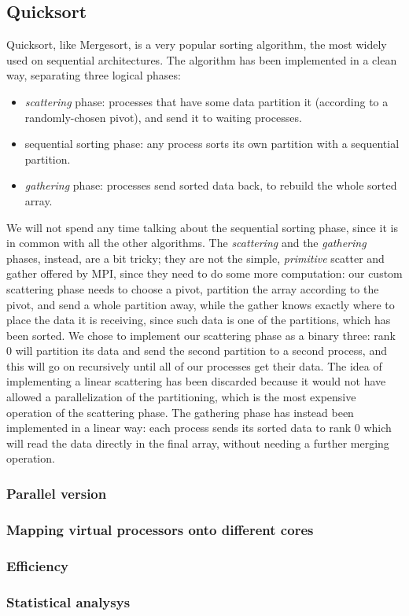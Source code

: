 \subsection{Quicksort}
Quicksort, like Mergesort, is a very popular sorting algorithm, the most widely used on sequential architectures. The algorithm has been implemented in a clean way, separating three logical phases:
\begin{itemize}
	\item{\textit{scattering} phase: processes that have some data partition it (according to a randomly-chosen pivot), and send it to waiting processes.}
	\item{sequential sorting phase: any process sorts its own partition with a sequential partition.}
	\item{\textit{gathering} phase: processes send sorted data back, to rebuild the whole sorted array.}
\end{itemize}
We will not spend any time talking about the sequential sorting phase, since it is in common with all the other algorithms.
The \textit{scattering} and the \textit{gathering} phases, instead, are a bit tricky; they are not the simple, \textit{primitive} scatter and gather offered by MPI, since they need to do some more computation: our custom scattering phase needs to choose a pivot, partition the array according to the pivot, and send a whole partition away, while the gather knows exactly where to place the data it is receiving, since such data is one of the partitions, which has been sorted.
We chose to implement our scattering phase as a binary three: rank 0 will partition its data and send the second partition to a second process, and this will go on recursively until all of our processes get their data. The idea of implementing a linear scattering has been discarded because it would not have allowed a parallelization of the partitioning, which is the most expensive operation of the scattering phase.
The gathering phase has instead been implemented in a linear way: each process sends its sorted data to rank 0 which will read the data directly in the final array, without needing a further merging operation.

\subsubsection*{Parallel version}
\subsubsection*{Mapping virtual processors onto different cores}  
\subsubsection*{Efficiency} 
\subsubsection*{Statistical analysys}


